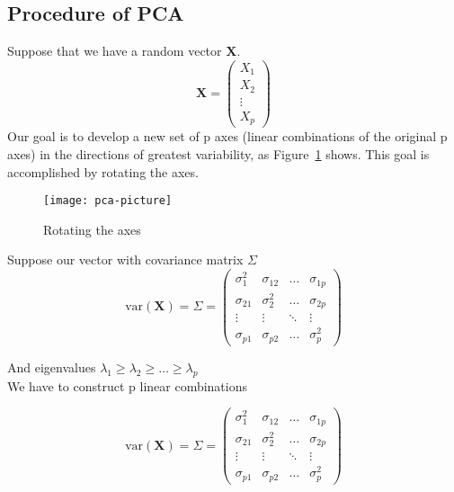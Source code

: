 \subsection{Procedure of PCA\cite{4_kantardzic}}

Suppose that we have a random vector $\textbf{X}$.
\begin{equation}
\textbf{X} = \left(\begin{array}{c} X_1\\ X_2\\ \vdots \\X_p\end{array}\right)
\end{equation}
Our goal is to develop a new set of p axes (linear combinations of the original p axes) in the directions of greatest variability, as Figure~\ref{fg:pca_pitcure} shows. This goal is accomplished by rotating the axes.

\begin{figure}[h]
	\centering
	\texttt{[image: pca-picture]}
	\caption{Rotating the axes}
	\label{fg:pca_pitcure}
\end{figure}

Suppose our vector with covariance matrix $\Sigma$
\begin{equation}
\text{var}(\textbf{X}) = \Sigma = \left(\begin{array}{cccc}\sigma^2_1 & \sigma_{12} & \dots &\sigma_{1p}\\ \sigma_{21} & \sigma^2_2 & \dots &\sigma_{2p}\\  \vdots & \vdots & \ddots & \vdots \\ \sigma_{p1} & \sigma_{p2} & \dots & \sigma^2_p\end{array}\right)
\end{equation}

And eigenvalues $ \lambda_1 \ge \lambda_2 \ge \dots \ge \lambda_p $ \\

We have to construct p linear combinations

\begin{equation}
\text{var}(\textbf{X}) = \Sigma = \left(\begin{array}{cccc}\sigma^2_1 & \sigma_{12} & \dots &\sigma_{1p}\\ \sigma_{21} & \sigma^2_2 & \dots &\sigma_{2p}\\  \vdots & \vdots & \ddots & \vdots \\ \sigma_{p1} & \sigma_{p2} & \dots & \sigma^2_p\end{array}\right)
\end{equation}

